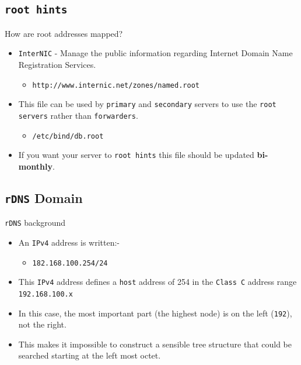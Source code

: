\documentclass[xcolor=table]{beamer}
\begin{document}
\subsection{\texttt{root hints}}
\begin{frame}{How are root addresses mapped?}
  \begin{itemize}
    \item \texttt{InterNIC} - Manage the public information regarding Internet Domain Name Registration Services. 
      \begin{itemize}
        \item \texttt{http://www.internic.net/zones/named.root} 
      \end{itemize}
    \item This file can be used by \texttt{primary} and \texttt{secondary} servers to use the \texttt{root servers} rather than \texttt{forwarders}.
      \begin{itemize}
        \item \texttt{/etc/bind/db.root} 
      \end{itemize}
    \item If you want your server to \texttt{root hints} this file should be updated \textbf{bi-monthly}.
  \end{itemize}
\end{frame}

\subsection{\texttt{rDNS} Domain}
\begin{frame}{\texttt{rDNS} background}
  \begin{itemize}
    \item An \texttt{IPv4} address is written:-
      \begin{itemize}
        \item \texttt{182.168.100.254/24} 
      \end{itemize}
    \item This \texttt{IPv4} address defines a \texttt{host} address of 254 in the \texttt{Class C} address range \texttt{192.168.100.x}
    \item In this case, the most important part (the highest node) is on the left (\texttt{192}), not the right. 
    \item This makes it impossible to construct a sensible tree structure that could be searched starting at the left most octet.
  \end{itemize}
\end{frame}
\end{document}
